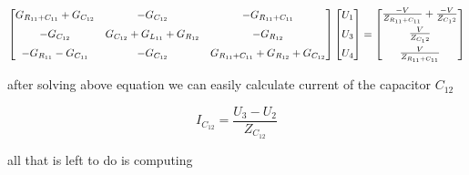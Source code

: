 \documentclass[notitlepage, a4paper, 11pt]{article}
\begin{document}
	$$
		\centering
		\begin{bmatrix}
			G_{R_{11}+C_{11}} + G_{C_{12}} & -G_{C_{12}} & -G_{R_{11}+C_{11}}\\[6pt]
			-G_{C_{12}} & G_{C_{12}} + G_{L_{11}} + G_{R_{12}} & -G_{R_{12}}\\[6pt]
			-G_{R_{11}}-G_{C_{11}} & -G_{C_{12}} & G_{R_{11}+C_{11}} + G_{R_{12}} + G_{C_{12}}
		\end{bmatrix}
		\begin{bmatrix}
			U_1\\[6pt]
			U_3\\[6pt]
			U_4
		\end{bmatrix}
		=
		\begin{bmatrix}
			\frac{-V}{Z_{R_{11}+C_{11}}}+\frac{-V}{Z_{C_12}}\\[6pt]
			\frac{V}{Z_{C_12}}\\[6pt]
			\frac{V}{Z_{R_{11}+C_{11}}}
		\end{bmatrix}
	$$
	
	after solving above equation we can easily calculate current of the capacitor $C_{12}$
	
	$$I_{C_{12}} = \frac{U_3 - U_2}{Z_{C_{12}}}$$

	all that is left to do is computing	
\end{document}
